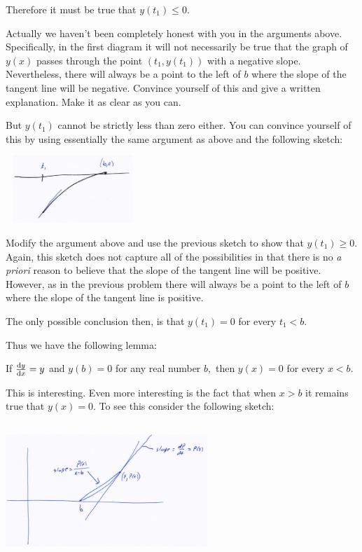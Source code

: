 Therefore it must be true that $y(t_1)\leq 0.$

\begin{embeddedproblem}{}
  Actually we haven't been completely honest with you in the arguments
  above. Specifically, in the first diagram it will not necessarily be
  true that the graph of $y(x)$ passes through the point
  $(t_1, y(t_1))$ with a negative slope. Nevertheless, there will
  always be a point to the left of $b$ where the slope of the
  tangent line will be negative. Convince yourself of this and give a
  written explanation. Make it as clear as you can.
\end{embeddedproblem}

But $y(t_1)$ cannot be strictly less than zero either. You can
convince yourself of this by using essentially the same argument as
above and the following sketch:\\

\centerline{\includegraphics*[height=1in,width=2in]{Figures/ExpFunc2}} 
\begin{embeddedproblem}{}
  Modify the argument above and use the previous sketch to show that
  $y(t_1)\geq0.$ Again, this sketch does not capture all of the
  possibilities in that there is no \emph{a priori} reason to believe
  that the slope of the tangent line will be positive. However, as in
  the previous problem there will always be a point to the left of $b$
  where the slope of the tangent line is positive. 
\end{embeddedproblem}

The only possible conclusion then, is that $y(t_1)=0$ for every
$t_1<b.$

Thus we have the following lemma:
\begin{mylemma}
  If $\frac{\text{d}{y}}{\text{d}{x}}=y$ and $y(b)=0$ for any real number $b,$ then $y(x)
  = 0$ for every $x<b.$
\end{mylemma}


This is interesting. Even more interesting is the fact that when $x>b$
it remains true that $y(x)=0.$ To see this consider the following
sketch:\\
\centerline{\includegraphics*[height=2in,width=3in]{Figures/ExpFunc3}}

